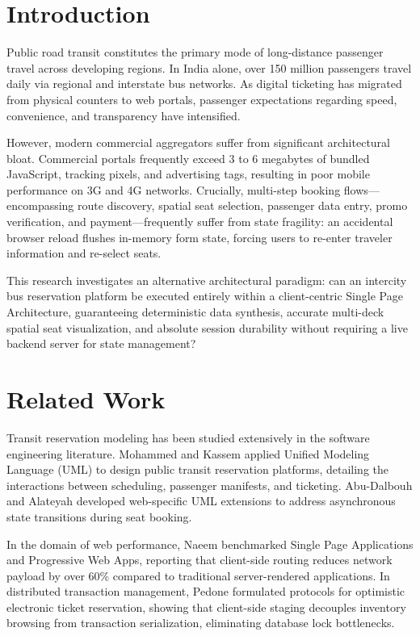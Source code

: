 \documentclass[journal,10pt,onecolumn]{IEEEtran}
\begin{document}
\section{Introduction}
Public road transit constitutes the primary mode of long-distance passenger travel across developing regions. In India alone, over 150 million passengers travel daily via regional and interstate bus networks. As digital ticketing has migrated from physical counters to web portals, passenger expectations regarding speed, convenience, and transparency have intensified.

However, modern commercial aggregators suffer from significant architectural bloat. Commercial portals frequently exceed 3 to 6 megabytes of bundled JavaScript, tracking pixels, and advertising tags, resulting in poor mobile performance on 3G and 4G networks. Crucially, multi-step booking flows—encompassing route discovery, spatial seat selection, passenger data entry, promo verification, and payment—frequently suffer from state fragility: an accidental browser reload flushes in-memory form state, forcing users to re-enter traveler information and re-select seats.

This research investigates an alternative architectural paradigm: can an intercity bus reservation platform be executed entirely within a client-centric Single Page Architecture, guaranteeing deterministic data synthesis, accurate multi-deck spatial seat visualization, and absolute session durability without requiring a live backend server for state management?

\section{Related Work}
Transit reservation modeling has been studied extensively in the software engineering literature. Mohammed and Kassem \cite{mohammed2020uml} applied Unified Modeling Language (UML) to design public transit reservation platforms, detailing the interactions between scheduling, passenger manifests, and ticketing. Abu-Dalbouh and Alateyah \cite{abudalbouh2020extension} developed web-specific UML extensions to address asynchronous state transitions during seat booking.

In the domain of web performance, Naeem \cite{naeem2019performance} benchmarked Single Page Applications and Progressive Web Apps, reporting that client-side routing reduces network payload by over 60\% compared to traditional server-rendered applications. In distributed transaction management, Pedone \cite{pedone2001optimistic} formulated protocols for optimistic electronic ticket reservation, showing that client-side staging decouples inventory browsing from transaction serialization, eliminating database lock bottlenecks.
\end{document}

